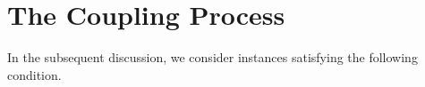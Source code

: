 \documentclass[11pt]{article}
\newtheorem{lemma}[theorem]{Lemma}
\newtheorem*{remark}{Remark}
\newcommand{\set}[1]{\left\{#1\right\}}
\newcommand{\defeq}{\triangleq} \renewcommand{\d}{\,\-d}
\newcommand{\vecf}{\boldsymbol{f}}
\newcommand{\qtodo}[1]{\todo[color = purple!40, size = \tiny]{\textbf{guoliang:} #1}}
\newcommand{\qgl}[1]{{\color{purple}{#1}}}
\newcommand{\zdnew}[1]{{\color{cyan} #1}}
\begin{document}




\section{The Coupling Process}



In the subsequent discussion, we consider instances satisfying the following condition.
\end{document}
